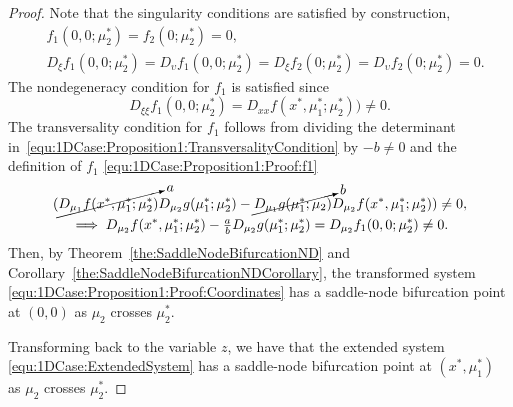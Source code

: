 \documentclass[12pt]{article}
\begin{document}
\begin{proof}
    Note that the singularity conditions are satisfied by construction,
    \begin{equation}
        \begin{aligned}
        & f_{1}(0,0;\mu_{2}^{*})=f_{2}(0;\mu_{2}^{*})=0, \\
        & D_{\xi}f_{1}(0,0;\mu_{2}^{*})=D_{\upsilon}f_{1}(0,0;\mu_{2}^{*})=D_{\xi}f_{2}(0;\mu_{2}^{*})=D_{\upsilon}f_{2}(0;\mu_{2}^{*})=0.
        \end{aligned}
        \label{equ:1DCase:Proposition1:Proof:NoLinearTerms}
    \end{equation}
    The nondegeneracy condition for $f_{1}$ is satisfied since
    \begin{equation*}
        D_{\xi\xi} f_{1}(0,0;\mu_{2}^{*}) = D_{xx}f(x^{*},\mu_{1}^{*};\mu_{2}^{*}))\neq0.
    \end{equation*}
    The transversality condition for $f_{1}$ follows from dividing the determinant in~\eqref{equ:1DCase:Proposition1:TransversalityCondition} by $-b\neq0$ and the definition of $f_{1}$ \eqref{equ:1DCase:Proposition1:Proof:f1}
    \begin{gather*}
        ( \cancelto{a}{D_{\mu_{1}}f(x^{*},\mu_{1}^{*};\mu_{2}^{*})} D_{\mu_{2}}g(\mu_{1}^{*};\mu_{2}^{*}) - \cancelto{b}{D_{\mu_{1}}g(\mu_{1}^{*};\mu_{2})} D_{\mu_{2}}f(x^{*},\mu_{1}^{*};\mu_{2}^{*}))\neq0,\\
        \implies D_{\mu_{2}}f(x^{*},\mu_{1}^{*};\mu_{2}^{*}) - \tfrac{a}{b}D_{\mu_{2}}g(\mu_{1}^{*};\mu_{2}^{*}) = D_{\mu_{2}}f_{1}(0,0;\mu_{2}^{*}) \neq 0.
    \end{gather*}
    Then, by Theorem~\ref{the:SaddleNodeBifurcationND} and Corollary~\ref{the:SaddleNodeBifurcationNDCorollary}, the transformed system \eqref{equ:1DCase:Proposition1:Proof:Coordinates} has a saddle-node bifurcation point at $(0,0)$ as $\mu_{2}$ crosses $\mu_{2}^{*}$.

    Transforming back to the variable $z$, we have that the extended system \eqref{equ:1DCase:ExtendedSystem} has a saddle-node bifurcation point at $(x^{*},\mu_{1}^{*})$ as $\mu_{2}$ crosses $\mu_{2}^{*}$.


\end{proof}
\end{document}
